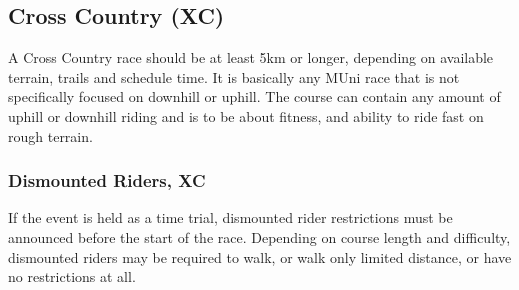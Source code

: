\subsection{Cross Country (XC)}
A Cross Country race should be at least 5km or longer, depending on available terrain, trails and schedule time.
It is basically any MUni race that is not specifically focused on downhill or uphill.
The course can contain any amount of uphill or downhill riding and is to be about fitness, and ability to ride fast on rough terrain.

\subsubsection{Dismounted Riders, XC}
If the event is held as a time trial, dismounted rider restrictions must be announced before the start of the race.
Depending on course length and difficulty, dismounted riders may be required to walk, or walk only limited distance, or have no restrictions at all.